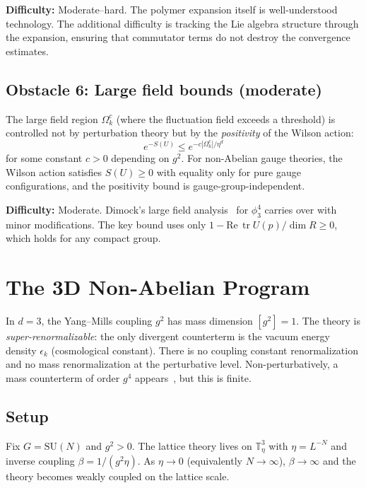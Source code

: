 \documentclass[11pt,a4paper]{article}
\theoremstyle{plain}
\theoremstyle{definition}
\theoremstyle{remark}
\newcommand{\T}{\mathbb{T}}
\newcommand{\tr}{\operatorname{tr}}
\newcommand{\SU}{\mathrm{SU}}
\begin{document}
\textbf{Difficulty:} Moderate--hard. The polymer
expansion itself is well-understood technology.
The additional difficulty is tracking the Lie algebra
structure through the expansion, ensuring that
commutator terms do not destroy the convergence
estimates.

\subsection{Obstacle 6: Large field bounds (moderate)}

The large field region $\Omega_k^c$ (where the
fluctuation field exceeds a threshold) is controlled
not by perturbation theory but by the \emph{positivity}
of the Wilson action:
\begin{equation}\label{eq:large_field}
  e^{-S(U)} \le e^{-c|\Omega_k^c| / \eta^d}
\end{equation}
for some constant $c > 0$ depending on $g^2$.
For non-Abelian gauge theories, the Wilson action
satisfies $S(U) \ge 0$ with equality only for
pure gauge configurations, and the positivity bound
is gauge-group-independent.

\textbf{Difficulty:} Moderate. Dimock's large field
analysis~\cite{Dimock13b} for $\phi^4_3$ carries over
with minor modifications. The key bound uses only
$1 - \text{Re}\,\tr U(p)/\dim R \ge 0$, which holds
for any compact group.

\section{The 3D Non-Abelian Program}\label{sec:ym3}

In $d = 3$, the Yang--Mills coupling $g^2$ has
mass dimension $[g^2] = 1$. The theory is
\emph{super-renormalizable}: the only divergent
counterterm is the vacuum energy density $\epsilon_k$
(cosmological constant). There is no coupling constant
renormalization and no mass renormalization at the
perturbative level. Non-perturbatively, a mass counterterm
of order $g^4$ appears~\cite{CS25}, but this is finite.

\subsection{Setup}

Fix $G = \SU(N)$ and $g^2 > 0$. The lattice
theory lives on $\T_\eta^3$ with $\eta = L^{-N}$
and inverse coupling $\beta = 1/(g^2 \eta)$.
As $\eta \to 0$ (equivalently $N \to \infty$),
$\beta \to \infty$ and the theory becomes weakly
coupled on the lattice scale.
\end{document}
